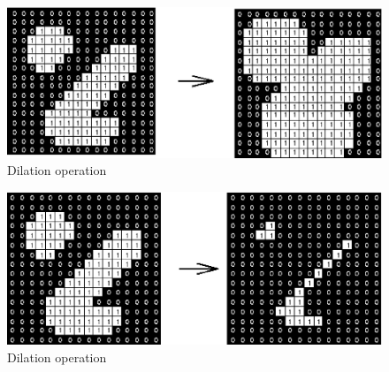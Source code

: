 \begin{figure}[H]
\centering
\includegraphics[scale=0.8]{diltbin}
\caption{Dilation operation}
\label{fig:dilate}
\end{figure} 

\begin{figure}[H]
\centering
\includegraphics[scale=0.8]{erodbin}
\caption{Dilation operation}
\label{fig:dilate}
\end{figure} 





